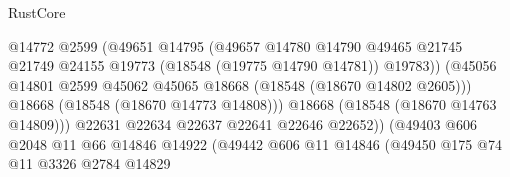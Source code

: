 \begin{lexlean}{RustCore}
\begin{coremodule}
                                              @14772
                                              @2599
                                              (@49651
                                                @14795
                                                (@49657
                                                  @14780
                                                  @14790
                                                  @49465
                                                  @21745
                                                  @21749
                                                  @24155
                                                  @19773
                                                  (@18548 (@19775 @14790 @14781))
                                                  @19783))
                                              (@45056
                                                @14801
                                                @2599
                                                @45062
                                                @45065
                                                @18668
                                                (@18548 (@18670 @14802 @2605)))
                                              @18668
                                              (@18548 (@18670 @14773 @14808)))
                                            @18668
                                            (@18548 (@18670 @14763 @14809)))
                                          @22631
                                          @22634
                                          @22637
                                          @22641
                                          @22646
                                          @22652))
                                      (@49403
                                        @606
                                        @2048
                                        @11
                                        @66
                                        @14846
                                        @14922
                                        (@49442
                                          @606
                                          @11
                                          @14846
                                          (@49450
                                            @175
                                            @74
                                            @11
                                            @3326
                                            @2784
                                            @14829

\end{coremodule}
\end{lexlean}
